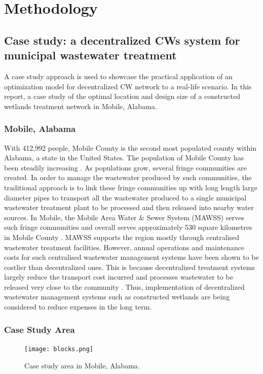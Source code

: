 \documentclass[preprint,12pt,authoryear]{elsarticle}
\begin{document}
\section{Methodology}\label{section:methodology}
\subsection{Case study: a decentralized CWs system for municipal wastewater treatment}
A case study approach is used to showcase the practical application of an optimization model for decentralized CW network to a real-life scenario. In this report, a case study of the optimal location and design size of a constructed wetlands treatment network in Mobile, Alabama.

\subsubsection{Mobile, Alabama}
With 412,992 people, Mobile County is the second most populated county within Alabama, a state in the United States. The population of Mobile County has been steadily increasing \citep{uscb2002census}. As populations grow, several fringe communities are created. In order to manage the wastewater produced by such communities, the traditional approach is to link these fringe communities up with long length large diameter pipes to transport all the wastewater produced to a single municipal wastewater treatment plant to be processed and then released into nearby water sources. In Mobile, the Mobile Area Water \& Sewer System (MAWSS) serves such fringe communities and overall serves approximately 530 square kilometres in Mobile County \citep{mawss2015}. MAWSS supports the region mostly through centralised wastewater treatment facilities. However, annual operations and maintenance costs for such centralised wastewater management systems have been shown to be costlier than decentralized ones. This is because decentralized treatment systems largely reduce the transport cost incurred and processes wastewater to be released very close to the community \citep{mawss2015}. Thus, implementation of decentralized wastewater management systems such as constructed wetlands are being considered to reduce expenses in the long term. 

\subsubsection{Case Study Area}
\begin{figure}[!htb]
	\centering
	\texttt{[image: blocks.png]}
	\caption{Case study area in Mobile, Alabama.}
	\label{fig:blocks}
\end{figure}
\end{document}
